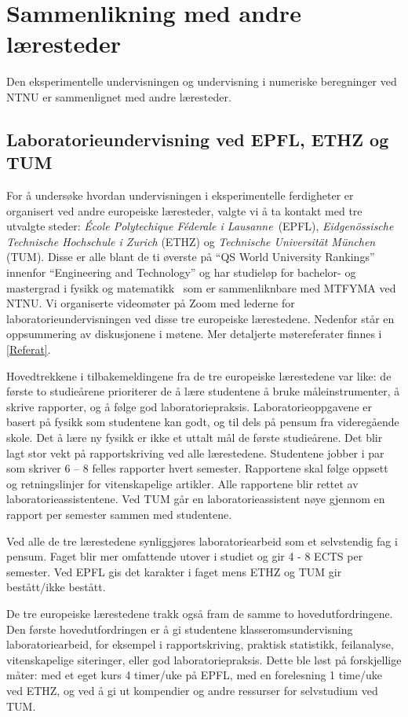 \documentclass{article}
\begin{document}
\section{Sammenlikning med andre læresteder}
Den eksperimentelle undervisningen og undervisning i numeriske beregninger ved NTNU er sammenlignet med andre læresteder.

\subsection{Laboratorieundervisning ved EPFL, ETHZ og TUM}
For å undersøke hvordan undervisningen i eksperimentelle ferdigheter er organisert ved andre europeiske læresteder, valgte vi å ta kontakt med tre utvalgte steder: \emph{École Polytechique Féderale i Lausanne}~(EPFL), \emph{Eidgenössische Technische Hochschule i Zurich} (ETHZ) og \emph{Technische Universität München} (TUM). Disse er alle blant de ti øverste på ``QS World University Rankings'' innenfor ``Engineering and Technology'' og har studieløp for bachelor- og mastergrad i fysikk og matematikk~\cite{ETHZprog,EPFLprog,TUMprog} som er sammenliknbare med MTFYMA ved NTNU.
Vi organiserte videomøter på Zoom med lederne for laboratorieundervisningen ved disse tre europeiske lærestedene. Nedenfor står en oppsummering av diskusjonene i møtene. Mer detaljerte møtereferater finnes i \cref{Referat}.

Hovedtrekkene i tilbakemeldingene fra de tre europeiske lærestedene var like: de første to studieårene prioriterer de å lære studentene å bruke måleinstrumenter, å skrive rapporter, og å følge god laboratoriepraksis. Laboratorieoppgavene er basert på fysikk som studentene kan godt, og til dels på pensum fra videregående skole. Det å lære ny fysikk er ikke et uttalt mål de første studieårene. Det blir lagt stor vekt på rapportskriving ved alle lærestedene. Studentene jobber i par som skriver 6 – 8 felles rapporter hvert semester. Rapportene skal følge oppsett og retningslinjer for vitenskapelige artikler. Alle rapportene blir rettet av laboratorieassistentene. Ved TUM går en laboratorieassistent nøye gjennom en rapport per semester sammen med studentene.

Ved alle de tre lærestedene synliggjøres laboratoriearbeid som et selvstendig fag i pensum. Faget blir mer omfattende utover i studiet og gir 4 - 8 ECTS per semester. Ved EPFL gis det karakter i faget mens ETHZ og TUM gir bestått/ikke bestått.

De tre europeiske lærestedene trakk også fram de samme to hovedutfordringene. Den første hovedutfordringen er å gi studentene klasseromsundervisning laboratoriearbeid, for eksempel i rapportskriving, praktisk statistikk, feilanalyse, vitenskapelige siteringer, eller god laboratoriepraksis. Dette ble løst på forskjellige måter: med et eget kurs 4 timer/uke på EPFL, med en forelesning 1 time/uke ved ETHZ, og ved å gi ut kompendier og andre ressurser for selvstudium ved TUM.
\end{document}
